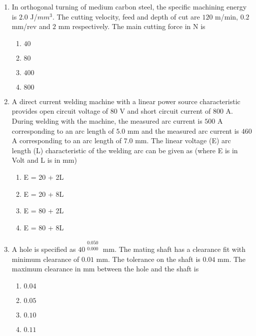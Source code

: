 \documentclass[journal]{IEEEtran}
\begin{document}
\begin{enumerate}[start = 52]
    \item In orthogonal turning of medium carbon steel, the specific machining energy is $2.0$ J/$mm^{3}$. The cutting velocity, feed and depth of cut are $120$ m/min, $0.2$ mm/rev and $2$ mm respectively. The main cutting force in N is
    \begin{multicols}{4}
        \begin{enumerate}
            \item $40$
            \item $80$
            \item $400$
            \item $800$
        \end{enumerate}
    \end{multicols}

    \item A direct current welding machine with a linear power source characteristic provides open circuit voltage of $80$ V and short circuit current of $800$ A. During welding with the machine, the measured arc current is $500$ A corresponding to an arc length of $5.0$ mm and the measured arc current is $460$ A corresponding to an arc length of $7.0$ mm. The linear voltage (E) arc length (L) characteristic of the welding arc can be given as (where E is in Volt and L is in mm)
    \begin{multicols}{4}
        \begin{enumerate}
            \item E = 20 + 2L
            \item E = 20 + 8L
            \item E = 80 + 2L
            \item E = 80 + 8L
        \end{enumerate}
    \end{multicols}

    \item A hole is specified as $40^{\begin{matrix} 0.050 \\ 0.000 \end{matrix}}$ mm. The mating shaft has a clearance fit with minimum clearance of $0.01$ mm. The tolerance on the shaft is $0.04$ mm. The maximum clearance in mm between the hole and the shaft is
    \begin{multicols}{4}
        \begin{enumerate}
            \item $0.04$
            \item $0.05$
            \item $0.10$
            \item $0.11$
        \end{enumerate}
    \end{multicols}


\end{enumerate}
\end{document}
